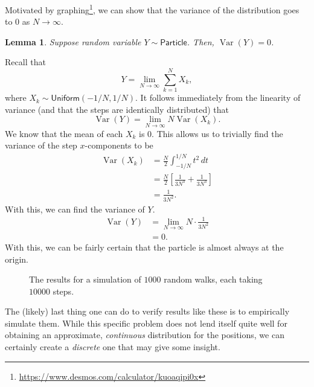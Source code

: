 \documentclass[10pt]{article}
\theoremstyle{customthm}
\newtheorem*{lemma}{Lemma}
\newenvironment{cproof}[1][\proofname]{%
  \proof[\scshape #1]%
}{\endproof}
\DeclareMathOperator{\variance}{\mathrm{Var}}
\newcommand{\Variance}[1]{\ensuremath{\variance \left( #1 \right)}}
\begin{document}
Motivated by graphing\footnote{\url{https://www.desmos.com/calculator/kuoaqipi0x}}, we can show that the variance of the distribution goes to \( 0 \) as \( N \to \infty \).
\begin{lemma}
    Suppose random variable \( Y \sim \textsf{Particle} \). Then, \( \variance (Y) = 0 \).
\end{lemma}
\begin{cproof}
    Recall that
    \[
        Y = \lim_{N \to \infty} \sum_{k = 1}^N X_k
    ,\]
    where \( X_k \sim \textsf{Uniform} (-1/N, 1/N) \). It follows immediately from the linearity of variance (and that the steps are identically distributed) that
    \[
        \variance(Y) = \lim_{N \to \infty} N \Variance{X_k}
    .\]
    We know that the mean of each \( X_k \) is \( 0 \). This allows us to trivially find the variance of the step \( x \)-components to be
    \begin{align*}
        \Variance{X_k} &= \frac{N}{2} \int_{-1/N}^{1/N} t^2 \, dt \\
        &= \frac{N}{2} \left[ \frac{1}{3N^3} + \frac{1}{3N^3} \right] \\
        &= \frac{1}{3N^2}
    .\end{align*}
    With this, we can find the variance of \( Y \).
    \begin{align*}
        \variance(Y) &= \lim_{N \to \infty} N \cdot \frac{1}{3N^2} \\
        &= 0
    .\end{align*}
\end{cproof}
With this, we can be fairly certain that the particle is almost always at the origin.

\begin{figure}
    \centering
    \caption{The results for a simulation of \( 1000 \) random walks, each taking \( 10000 \) steps.}
    \label{fig:empirical}
\end{figure}

The (likely) last thing one can do to verify results like these is to empirically simulate them. While this specific problem does not lend itself quite well for obtaining an approximate, \textit{continuous} distribution for the positions, we can certainly create a \textit{discrete} one that may give some insight.
\end{document}
